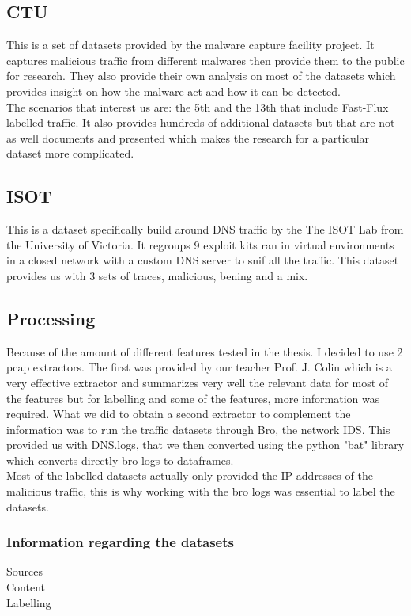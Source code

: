 \subsection{CTU}
This is a set of datasets provided by the malware capture facility project\cite{CTU}. It captures malicious traffic from different malwares then provide them to the public for research. They also provide their own analysis on most of the datasets which provides insight on how the malware act and how it can be detected.\\
The scenarios that interest us are: the 5th and the 13th that include Fast-Flux labelled traffic.
It also provides hundreds of additional datasets but that are not as well documents and presented which makes the research for a particular dataset more complicated.
\subsection{ISOT}
This is a dataset specifically build around DNS traffic by the The ISOT Lab from the University of Victoria. It regroups 9 exploit kits ran in virtual environments in a closed network with a custom DNS server to snif all the traffic. This dataset provides us with 3 sets of traces, malicious, bening and a mix\cite{ISOT}.
\subsection{Processing}
Because of the amount of different features tested in the thesis. I decided to use 2 pcap extractors. The first was provided by our teacher Prof. J. Colin which is a very effective extractor and summarizes very well the relevant data for most of the features but for labelling and some of the features, more information was required. What we did to obtain a second extractor to complement the information was to run the traffic datasets through Bro, the network IDS. This provided us with DNS.logs, that we then converted using the python "bat" library which converts directly bro logs to dataframes.\\
Most of the labelled datasets actually only provided the IP addresses of the malicious traffic, this is why working with the bro logs was essential to label the datasets.


\subsubsection{Information regarding the datasets}
Sources\\
Content\\
Labelling\\
